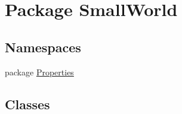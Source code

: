 \hypertarget{namespace_small_world}{\section{Package Small\-World}
\label{namespace_small_world}
}
\subsection*{Namespaces}
\begin{DoxyCompactItemize}
\item 
package \hyperlink{namespace_small_world_1_1_properties}{Properties}
\end{DoxyCompactItemize}
\subsection*{Classes}

